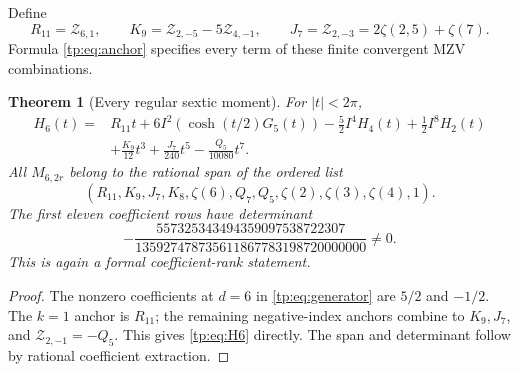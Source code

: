 \documentclass[11pt,a4paper]{article}
\numberwithin{equation}{section}
\newtheorem{theorem}{Theorem}[section]
\theoremstyle{definition}
\theoremstyle{remark}
\begin{document}
Define
\begin{equation}\label{tp:eq:new6}
 R_{11}=\mathcal Z_{6,1},\qquad
 K_9=\mathcal Z_{2,-5}-5\mathcal Z_{4,-1},\qquad
 J_7=\mathcal Z_{2,-3}=2\zeta(2,5)+\zeta(7).
\end{equation}
Formula \eqref{tp:eq:anchor} specifies every term of these finite
convergent MZV combinations.

\begin{theorem}[Every regular sextic moment]
\label{tp:thm:six}
For $|t|<2\pi$,
\begin{equation}\label{tp:eq:H6}
 \boxed{\begin{aligned}
 H_6(t)={}&R_{11}t+6I^2(\cosh(t/2)G_5(t))
          -\frac52I^4H_4(t)+\frac12I^8H_2(t)\\
         &+\frac{K_9}{12}t^3+\frac{J_7}{240}t^5
          -\frac{Q_5}{10080}t^7.
 \end{aligned}}
\end{equation}
All $M_{6,2r}$ belong to the rational span of the ordered list
\begin{equation}\label{tp:eq:space6}
 (R_{11},K_9,J_7,K_8,\zeta(6),Q_7,Q_5,
                       \zeta(2),\zeta(3),\zeta(4),1).
\end{equation}
The first eleven coefficient rows have determinant
\begin{equation}\label{tp:eq:rank6}
 -\frac{557325343494359097538722307}
         {135927478735611867783198720000000}\ne0.
\end{equation}
This is again a formal coefficient-rank statement.
\end{theorem}

\begin{proof}
The nonzero coefficients at $d=6$ in \eqref{tp:eq:generator} are
$5/2$ and $-1/2$.  The $k=1$ anchor is $R_{11}$; the remaining
negative-index anchors combine to $K_9,J_7$, and
$\mathcal Z_{2,-1}=-Q_5$.  This gives \eqref{tp:eq:H6} directly.
The span and determinant follow by rational coefficient extraction.
\end{proof}
\end{document}
